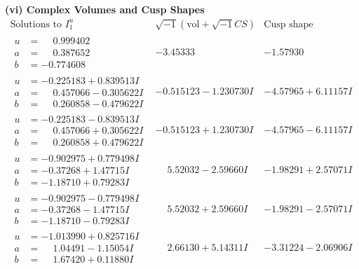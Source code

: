 \documentclass[1p]{elsarticle_modified}
\theoremstyle{definition}
\newcommand{\I}{\sqrt{-1}}
\begin{document}
\newpage\flushleft \textbf{(vi) Complex Volumes and Cusp Shapes}
$$\begin{array}{c|c|c}  
\text{Solutions to }I^u_{1}& \I (\text{vol} + \sqrt{-1}CS) & \text{Cusp shape}\\
 \hline 
\begin{aligned}
u &= \phantom{-}0.999402\phantom{ +0.000000I} \\
a &= \phantom{-}0.387652\phantom{ +0.000000I} \\
b &= -0.774608\phantom{ +0.000000I}\end{aligned}
 & -3.45333\phantom{ +0.000000I} & -1.57930\phantom{ +0.000000I} \\ \hline\begin{aligned}
u &= -0.225183 + 0.839513 I \\
a &= \phantom{-}0.457066 - 0.305622 I \\
b &= \phantom{-}0.260858 - 0.479622 I\end{aligned}
 & -0.515123 - 1.230730 I & -4.57965 + 6.11157 I \\ \hline\begin{aligned}
u &= -0.225183 - 0.839513 I \\
a &= \phantom{-}0.457066 + 0.305622 I \\
b &= \phantom{-}0.260858 + 0.479622 I\end{aligned}
 & -0.515123 + 1.230730 I & -4.57965 - 6.11157 I \\ \hline\begin{aligned}
u &= -0.902975 + 0.779498 I \\
a &= -0.37268 + 1.47715 I \\
b &= -1.18710 + 0.79283 I\end{aligned}
 & \phantom{-}5.52032 - 2.59660 I & -1.98291 + 2.57071 I \\ \hline\begin{aligned}
u &= -0.902975 - 0.779498 I \\
a &= -0.37268 - 1.47715 I \\
b &= -1.18710 - 0.79283 I\end{aligned}
 & \phantom{-}5.52032 + 2.59660 I & -1.98291 - 2.57071 I \\ \hline\begin{aligned}
u &= -1.013990 + 0.825716 I \\
a &= \phantom{-}1.04491 - 1.15054 I \\
b &= \phantom{-}1.67420 + 0.11880 I\end{aligned}
 & \phantom{-}2.66130 + 5.14311 I & -3.31224 - 2.06906 I \\ \hline\begin{aligned}

\end{aligned}
\end{array}$$
\end{document}

